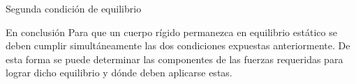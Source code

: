 \documentclass[11pt,handout,aspectratio=1610]{beamer}
\newcommand{\norm}[1]{\left\vert\left\vert #1 \right\vert\right\vert}
\begin{document}
\begin{frame}{Segunda condición de equilibrio}

    \begin{block}{En conclusión}
        Para que un cuerpo rígido permanezca en equilibrio estático se deben cumplir simultáneamente las dos condiciones expuestas anteriormente. De esta forma se puede determinar las componentes de las fuerzas requeridas para lograr dicho equilibrio y dónde deben aplicarse estas.
    \end{block}

\end{frame}





\end{document}
